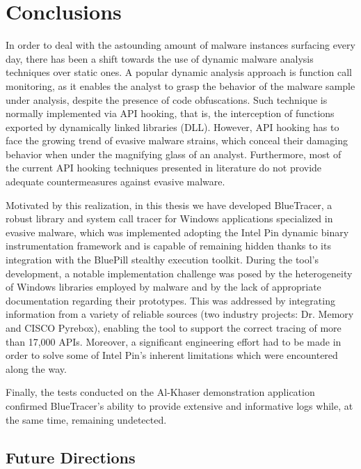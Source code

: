
\chapter{Conclusions}

In order to deal with the astounding amount of malware instances surfacing every day, there has been a shift towards the use of dynamic malware analysis techniques over static ones. A popular dynamic analysis approach is function call monitoring, as it enables the analyst to grasp the behavior of the malware sample under analysis, despite the presence of code obfuscations. Such technique is normally implemented via API hooking, that is, the interception of functions exported by dynamically linked libraries (DLL). However, API hooking has to face the growing trend of evasive malware strains, which conceal their damaging behavior when under the magnifying glass of an analyst. Furthermore, most of the current API hooking techniques presented in literature do not provide adequate countermeasures against evasive malware.

Motivated by this realization, in this thesis we have developed BlueTracer, a robust library and system call tracer for Windows applications specialized in evasive malware, which was implemented adopting the Intel Pin dynamic binary instrumentation framework and is capable of remaining hidden thanks to its integration with the BluePill stealthy execution toolkit. During the tool's development, a notable implementation challenge was posed by the heterogeneity of Windows libraries employed by malware and by the lack of appropriate documentation regarding their prototypes. This was addressed by integrating information from a variety of reliable sources (two industry projects: Dr. Memory and CISCO Pyrebox), enabling the tool to support the correct tracing of more than 17,000 APIs. Moreover, a significant engineering effort had to be made in order to solve some of Intel Pin's inherent limitations which were encountered along the way.

Finally, the tests conducted on the Al-Khaser demonstration application confirmed BlueTracer's ability to provide extensive and informative logs while, at the same time, remaining undetected.    

\section{Future Directions}

